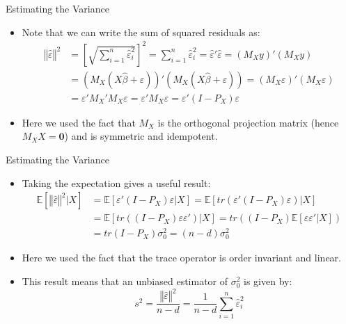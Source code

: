 \documentclass[fleqn, 10pt]{beamer}
\newcommand{\E}{\mathbb{E}}
\begin{document}
\begin{frame}{Estimating the Variance}
	
	\begin{itemize}
		\item Note that we can write the sum of squared residuals as:
		\begin{align*}
		\left\Vert \hat{\varepsilon} \right\Vert^2 &= \left[ \sqrt{ \sum_{i=1}^{n} \hat{\varepsilon}_i^2 } \right]^2 = \sum_{i=1}^{n} \hat{\varepsilon}_i^2 = \hat{\varepsilon}' \hat{\varepsilon} = \left( M_{X}y  \right)' \left(M_{X} y \right) \\
			&= \left( M_{X}(X\hat{\beta} + \varepsilon)  \right)' \left(M_{X} (X\hat{\beta} + \varepsilon) \right) = \left( M_{X} \varepsilon  \right)' \left(M_{X} \varepsilon \right) \\
			&= \varepsilon'M_{X}'M_{X}\varepsilon = \varepsilon'M_{X}\varepsilon = \varepsilon'(I-P_{X})\varepsilon
		\end{align*}
		\item Here we used the fact that \(M_{X}\) is the orthogonal projection matrix (hence \(M_{X}X = \mathbf{0}\)) and is symmetric and idempotent.
	\end{itemize}
	
\end{frame}


\begin{frame}{Estimating the Variance}
	
	\begin{itemize}
		\item Taking the expectation gives a useful result:
		\begin{align*}
		\E[\left\Vert \hat{\varepsilon} \right\Vert^2 | X] &= \E[ \varepsilon'(I-P_{X})\varepsilon | X] = \E\left[ tr\left( \varepsilon'(I-P_{X})\varepsilon \right) | X\right] \\
			&= \E\left[ tr\left( (I-P_{X})\varepsilon\varepsilon' \right) | X\right] = tr\left(  (I-P_{X}) \E\left[ \varepsilon\varepsilon' | X\right] \right) \\
			&= tr\left(  I-P_{X} \right) \sigma_0^2 = (n-d)\sigma_0^2
		\end{align*}
		\item Here we used the fact that the trace operator is order invariant and linear.
		\item This result means that an unbiased estimator of \(\sigma_0^2\) is given by:
		\[ s^2 = \frac{\left\Vert \hat{\varepsilon} \right\Vert^2}{n-d} = \frac{1}{n-d} \sum_{i=1}^{n} \hat{\varepsilon}_i^2 \]
	\end{itemize}
	
\end{frame}
\end{document}
